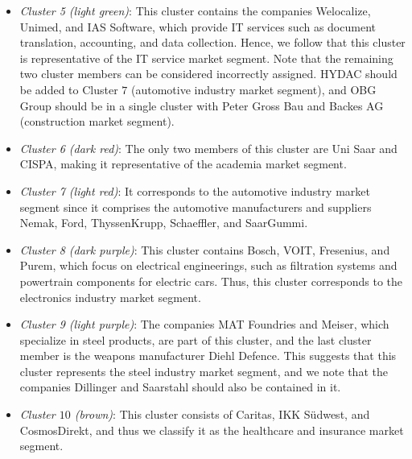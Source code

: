 \documentclass[conference]{IEEEtran}
\begin{document}
\begin{itemize}
    \item \textit{Cluster 5 (light green)}: This cluster contains the companies Welocalize, Unimed, and IAS Software, which provide IT services such as document translation, accounting, and data collection. Hence, we follow that this cluster is representative of the IT service market segment. Note that the remaining two cluster members can be considered incorrectly assigned. HYDAC should be added to Cluster $7$ (automotive industry market segment), and OBG Group should be in a single cluster with Peter Gross Bau and Backes AG (construction market segment).

    \item \textit{Cluster 6 (dark red)}: The only two members of this cluster are Uni Saar and CISPA, making it representative of the academia market segment.

    \item \textit{Cluster 7 (light red)}: It corresponds to the automotive industry market segment since it comprises the automotive manufacturers and suppliers Nemak, Ford, ThyssenKrupp, Schaeffler, and SaarGummi.

    \item \textit{Cluster 8 (dark purple)}: This cluster contains Bosch, VOIT, Fresenius, and Purem, which focus on electrical engineerings, such as filtration systems and powertrain components for electric cars. Thus, this cluster corresponds to the electronics industry market segment.

    \item \textit{Cluster 9 (light purple)}: The companies MAT Foundries and Meiser, which specialize in steel products, are part of this cluster, and the last cluster member is the weapons manufacturer Diehl Defence. This suggests that this cluster represents the steel industry market segment, and we note that the companies Dillinger and Saarstahl should also be contained in it.

    \item \textit{Cluster $10$ (brown)}: This cluster consists of Caritas, IKK Südwest, and CosmosDirekt, and thus we classify it as the healthcare and insurance market segment.
\end{itemize}
\end{document}
